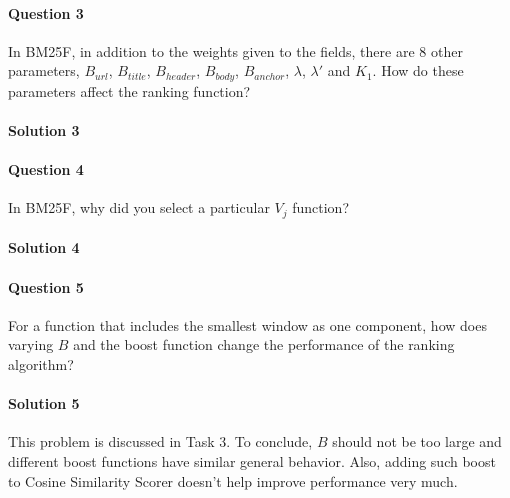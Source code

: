 \documentclass{article}
\begin{document}
\paragraph{Question 3}
In BM25F, in addition to the weights given to the fields, there are 8 other parameters, $B_{url}$, $B_{title}$, $B_{header}$, $B_{body}$, $B_{anchor}$, $\lambda$, $\lambda'$ and $K_1$. How do these parameters affect the ranking function?

\paragraph{Solution 3}

\paragraph{Question 4}
In BM25F, why did you select a particular $V_j$ function?

\paragraph{Solution 4}

\paragraph{Question 5}
For a function that includes the smallest window as one component, how does varying $B$ and the boost function change the performance of the ranking algorithm?

\paragraph{Solution 5}
This problem is discussed in Task 3. To conclude, $B$ should not be too large and different boost functions have similar general behavior. Also, adding such boost to Cosine Similarity Scorer doesn't help improve performance very much.
\end{document}
